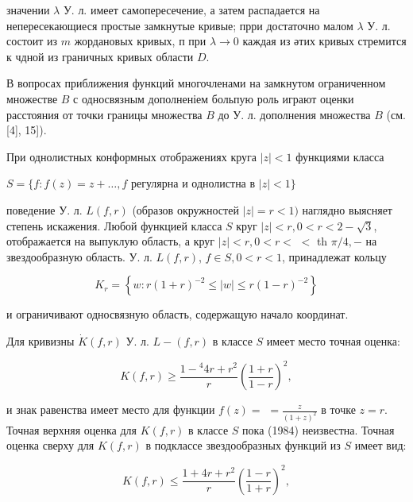 \documentclass[10pt]{article}
\begin{document}
значении $\lambda$ У. л. имеет самопересечение, а затем распадается на непересекающиеся простые замкнутые кривые; прри достаточно малом $\lambda$ У. л. состоит из $m$ жордановых кривых, п при $\lambda \rightarrow 0$ каждая из әтих кривых стремится к чдной из граничных кривых области $D$.



В вопросах приближения функций многочленами на замкнутом ограниченном множестве $B$ с односвязным дополненіем больпую роль играют оценки расстояния от точки границы множества $B$ до У. л. дополнения множества $B$ (см. [4], 15]).



При однолистных конформных отображениях круга $|z|<1$ функциями класса



$S=\{f: f(z)=z+\ldots, f$ регулярна и однолистна в $|z|<1\}$



поведение У. л. $L(f, r)$ (образов окружностей $|z|=r<1)$ наглядно выясняет степень искажения. Любой функцией класса $S$ круг $|z|<r, 0<r<2-\sqrt{3}$, отображается на выпуклую область, а круг $|z|<r, 0<r<$ $<$ th $\pi / 4,-$ на звездообразную область. У. л. $L(f, r)$, $f \in S, 0<r<1$, принадлежат кольцу



\[

K_{r}=\left\{w: r(1+r)^{-2} \leqslant|w| \leqslant r(1-r)^{-2}\right\}

\]



и ограничивают односвязную область, содержащую начало координат.



Для кривизны $\dot{K}(f, r)$ У. л. $L-(f, r)$ в классе $S$ имеет место точная оценка:



\[

K(f, r) \geqslant \frac{1-{ }^{4} 4 r+r^{2}}{r}\left(\frac{1+r}{1-r}\right)^{2},

\]



и знак равенства имеет место для функции $f(z)=$ $=\frac{z}{(1+z)^{2}}$ в точке $z=r$. Точная верхняя оценка для $K(f, r)$ в классе $S$ пока (1984) неизвестна. Точная оценка сверху для $K(f, r)$ в подклассе звездообразных функций из $S$ имеет вид:



\[

K(f, r) \leqslant \frac{1+4 r+r^{2}}{r}\left(\frac{1-r}{1+r}\right)^{2},

\]
\end{document}
